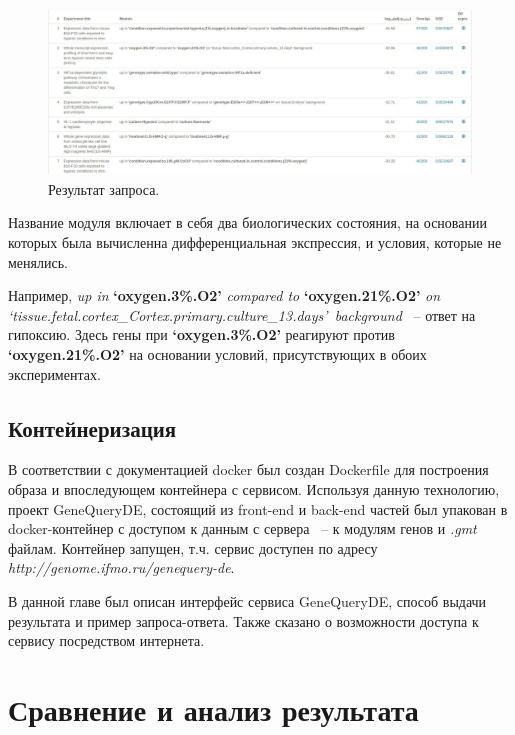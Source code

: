 \documentclass[times,specification,annotation]{itmo-student-thesis}
\begin{document}
\begin{figure}[!h]
    \caption{Результат запроса.}\label{clientResponse}
    \centering
    \includegraphics[width=1\textwidth]{response.jpg}
\end{figure}

Название модуля включает в себя два биологических состояния, на основании которых была вычисленна дифференциальная экспрессия, и условия, которые не менялись.

Например, \textit{up in} \textbf{\lq oxygen.3\%.O2\rq } \textit{compared to} \textbf{\lq oxygen.21\%.O2\rq} \textit{on \lq tissue.fetal.cortex\_Cortex.primary.culture\_13.days\rq~background} ~-- ответ на гипоксию. Здесь гены при \textbf{\lq oxygen.3\%.O2\rq} реагируют против \textbf{\lq oxygen.21\%.O2\rq} на основании условий, присутствующих в обоих экспериментах. 

\section{Контейнеризация}

В соответствии с документацией docker\cite{Docker} был создан Dockerfile для построения образа и впоследующем контейнера с сервисом. Используя данную технологию, проект GeneQueryDE, состоящий из front-end и back-end частей был упакован в docker-контейнер с доступом к данным с сервера ~-- к модулям генов и \textit{.gmt} файлам. Контейнер запущен, т.ч. сервис доступен по адресу \textit{http://genome.ifmo.ru/genequery-de}.  

\chapterconclusion

В данной главе был описан интерфейс сервиса GeneQueryDE, способ выдачи результата и пример запроса-ответа. Также сказано о возможности доступа к сервису посредством интернета. 

\chapter{Сравнение и анализ результата}
\end{document}

